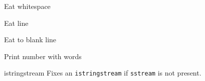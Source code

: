 \categorycontents{}

\begin{algorithm}{Eat whitespace}
\end{algorithm}
\begin{algorithm}{Eat line}
\end{algorithm}
\begin{algorithm}{Eat to blank line}
\end{algorithm}
\begin{algorithm}{Print number with words}
\end{algorithm}

\begin{algorithm}{istringstream}
\desc
Fixes an {\tt istringstream} if {\tt sstream} is not present.
\end{algorithm}

\begin{sourceslandscape}
\end{sourceslandscape}
